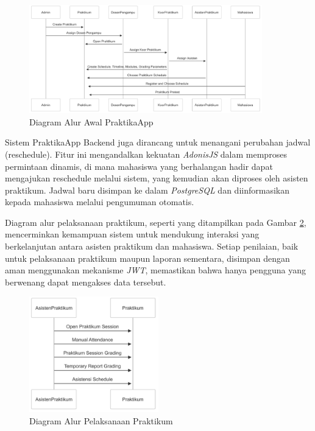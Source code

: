 \begin{figure}[H]
    \centering
    \includegraphics[width=0.9\textwidth]{gambar/init_flow.png}
    \caption{Diagram Alur Awal PraktikaApp}
    \label{fig:initial_flow}
\end{figure}

Sistem PraktikaApp Backend juga dirancang untuk menangani perubahan jadwal (reschedule). Fitur ini mengandalkan kekuatan \emph{AdonisJS} dalam memproses permintaan dinamis, di mana mahasiswa yang berhalangan hadir dapat mengajukan reschedule melalui sistem, yang kemudian akan diproses oleh asisten praktikum. Jadwal baru disimpan ke dalam \emph{PostgreSQL} dan diinformasikan kepada mahasiswa melalui pengumuman otomatis.

Diagram alur pelaksanaan praktikum, seperti yang ditampilkan pada Gambar \ref{fig:practicum_flow}, mencerminkan kemampuan sistem untuk mendukung interaksi yang berkelanjutan antara asisten praktikum dan mahasiswa. Setiap penilaian, baik untuk pelaksanaan praktikum maupun laporan sementara, disimpan dengan aman menggunakan mekanisme \emph{JWT}, memastikan bahwa hanya pengguna yang berwenang dapat mengakses data tersebut.

\begin{figure}[H]
    \centering
    \includegraphics[width=0.5\textwidth]{gambar/prac_flow.png}
    \caption{Diagram Alur Pelaksanaan Praktikum}
    \label{fig:practicum_flow}
\end{figure}


